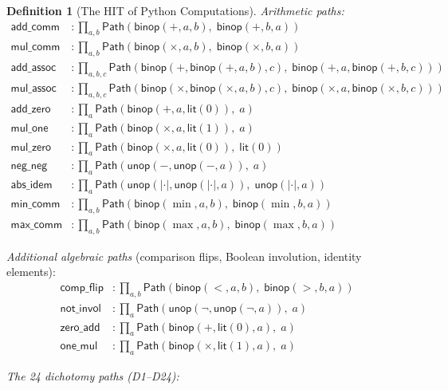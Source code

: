 \documentclass[11pt,a4paper]{report}
\theoremstyle{definition}
\newtheorem{definition}{Definition}[chapter]
\theoremstyle{plain}
\newcommand{\Path}{\mathsf{Path}}
\begin{document}
\begin{definition}[The HIT of Python Computations]
\medskip
\emph{Arithmetic paths:}
\begin{align}
  \mathsf{add\_comm} &: \prod_{a,b} \Path(\mathsf{binop}(+, a, b),\;
    \mathsf{binop}(+, b, a)) \\
  \mathsf{mul\_comm} &: \prod_{a,b} \Path(\mathsf{binop}(\times, a, b),\;
    \mathsf{binop}(\times, b, a)) \\
  \mathsf{add\_assoc} &: \prod_{a,b,c} \Path(
    \mathsf{binop}(+, \mathsf{binop}(+, a, b), c),\;
    \mathsf{binop}(+, a, \mathsf{binop}(+, b, c))) \\
  \mathsf{mul\_assoc} &: \prod_{a,b,c} \Path(
    \mathsf{binop}(\times, \mathsf{binop}(\times, a, b), c),\;
    \mathsf{binop}(\times, a, \mathsf{binop}(\times, b, c))) \\
  \mathsf{add\_zero} &: \prod_a \Path(\mathsf{binop}(+, a,
    \mathsf{lit}(0)),\; a) \\
  \mathsf{mul\_one} &: \prod_a \Path(\mathsf{binop}(\times, a,
    \mathsf{lit}(1)),\; a) \\
  \mathsf{mul\_zero} &: \prod_a \Path(\mathsf{binop}(\times, a,
    \mathsf{lit}(0)),\; \mathsf{lit}(0)) \\
  \mathsf{neg\_neg} &: \prod_a \Path(\mathsf{unop}(-,
    \mathsf{unop}(-, a)),\; a) \\
  \mathsf{abs\_idem} &: \prod_a \Path(\mathsf{unop}(|\cdot|,
    \mathsf{unop}(|\cdot|, a)),\; \mathsf{unop}(|\cdot|, a)) \\
  \mathsf{min\_comm} &: \prod_{a,b} \Path(\mathsf{binop}(\min, a, b),\;
    \mathsf{binop}(\min, b, a)) \\
  \mathsf{max\_comm} &: \prod_{a,b} \Path(\mathsf{binop}(\max, a, b),\;
    \mathsf{binop}(\max, b, a))
\end{align}

\emph{Additional algebraic paths} (comparison flips, Boolean involution,
identity elements):
\begin{align}
  \mathsf{comp\_flip} &: \prod_{a,b} \Path(\mathsf{binop}(<, a, b),\;
    \mathsf{binop}(>, b, a)) \\
  \mathsf{not\_invol} &: \prod_a \Path(\mathsf{unop}(\neg,
    \mathsf{unop}(\neg, a)),\; a) \\
  \mathsf{zero\_add} &: \prod_a \Path(\mathsf{binop}(+,
    \mathsf{lit}(0), a),\; a) \\
  \mathsf{one\_mul} &: \prod_a \Path(\mathsf{binop}(\times,
    \mathsf{lit}(1), a),\; a)
\end{align}

\emph{The 24 dichotomy paths (D1--D24):}


\end{definition}
\end{document}
